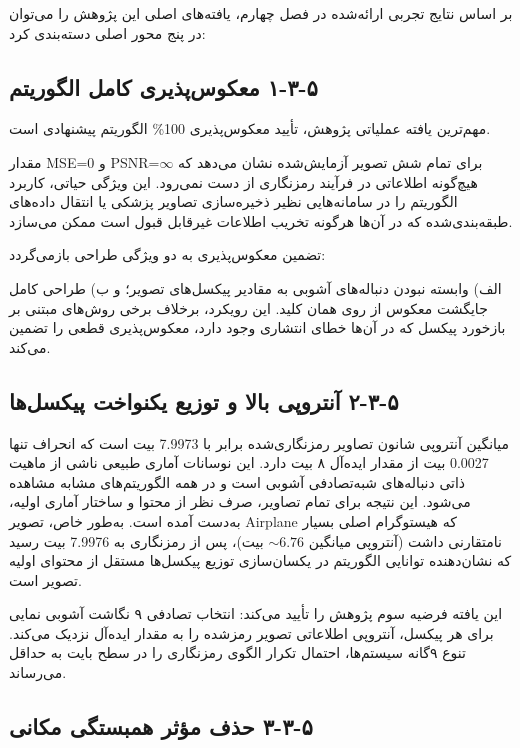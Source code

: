 بر اساس نتایج تجربی ارائه‌شده در فصل چهارم، یافته‌های اصلی این پژوهش را می‌توان در پنج محور اصلی دسته‌بندی کرد:

\subsection{‏۵‏-‏۳‏-‏۱‏ معکوس‌پذیری کامل الگوریتم}

مهم‌ترین یافته عملیاتی پژوهش، تأیید معکوس‌پذیری 100\% الگوریتم پیشنهادی است.

مقدار MSE=0 و PSNR=$\infty$ برای تمام شش تصویر آزمایش‌شده نشان می‌دهد که هیچ‌گونه اطلاعاتی در فرآیند رمزنگاری از دست نمی‌رود. این ویژگی حیاتی، کاربرد الگوریتم را در سامانه‌هایی نظیر ذخیره‌سازی تصاویر پزشکی یا انتقال داده‌های طبقه‌بندی‌شده که در آن‌ها هرگونه تخریب اطلاعات غیرقابل قبول است  ممکن می‌سازد.

تضمین معکوس‌پذیری به دو ویژگی طراحی بازمی‌گردد:

الف) وابسته نبودن دنباله‌های آشوبی به مقادیر پیکسل‌های تصویر؛ و ب) طراحی کامل جایگشت معکوس از روی همان کلید. این رویکرد، برخلاف برخی روش‌های مبتنی بر بازخورد پیکسل که در آن‌ها خطای انتشاری وجود دارد، معکوس‌پذیری قطعی را تضمین می‌کند.

\subsection{‏۵‏-‏۳‏-‏۲‏ آنتروپی بالا و توزیع یکنواخت پیکسل‌ها}

میانگین آنتروپی شانون تصاویر رمزنگاری‌شده برابر با 7.9973 بیت است که انحراف تنها 0.0027 بیت از مقدار ایده‌آل ۸ بیت دارد. این نوسانات آماری طبیعی ناشی از ماهیت ذاتی دنباله‌های شبه‌تصادفی آشوبی است و در همه الگوریتم‌های مشابه مشاهده می‌شود. این نتیجه برای تمام تصاویر، صرف نظر از محتوا و ساختار آماری اولیه، به‌دست آمده است. به‌طور خاص، تصویر Airplane که هیستوگرام اصلی بسیار نامتقارنی داشت (آنتروپی میانگین $\sim 6.76$ بیت)، پس از رمزنگاری به 7.9976 بیت رسید که نشان‌دهنده توانایی الگوریتم در یکسان‌سازی توزیع پیکسل‌ها مستقل از محتوای اولیه تصویر است.

این یافته فرضیه سوم پژوهش را تأیید می‌کند: انتخاب تصادفی ۹ نگاشت آشوبی نمایی برای هر پیکسل، آنتروپی اطلاعاتی تصویر رمزشده را به مقدار ایده‌آل نزدیک می‌کند. تنوع ۹گانه سیستم‌ها، احتمال تکرار الگوی رمزنگاری را در سطح بایت به حداقل می‌رساند.

\subsection{‏۵‏-‏۳‏-‏۳‏ حذف مؤثر همبستگی مکانی}

